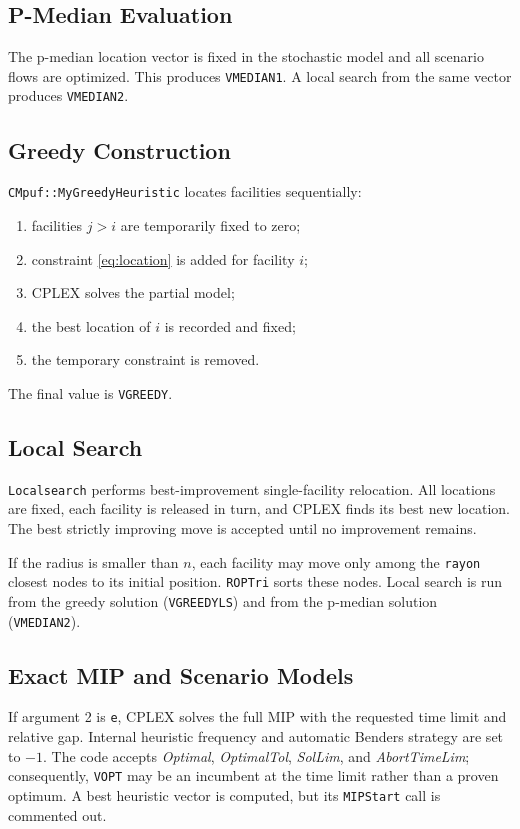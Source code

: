 \documentclass[11pt,a4paper]{article}
\newcommand{\code}[1]{\texttt{#1}}
\begin{document}
\subsection{P-Median Evaluation}

The p-median location vector is fixed in the stochastic model and all
scenario flows are optimized. This produces \code{VMEDIAN1}. A local search
from the same vector produces \code{VMEDIAN2}.

\subsection{Greedy Construction}

\code{CMpuf::MyGreedyHeuristic} locates facilities sequentially:
\begin{enumerate}
\item facilities $j>i$ are temporarily fixed to zero;
\item constraint \eqref{eq:location} is added for facility $i$;
\item CPLEX solves the partial model;
\item the best location of $i$ is recorded and fixed;
\item the temporary constraint is removed.
\end{enumerate}
The final value is \code{VGREEDY}.

\subsection{Local Search}

\code{Localsearch} performs best-improvement single-facility relocation. All
locations are fixed, each facility is released in turn, and CPLEX finds its
best new location. The best strictly improving move is accepted until no
improvement remains.

If the radius is smaller than $n$, each facility may move only among the
\code{rayon} closest nodes to its initial position. \code{ROPTri} sorts these
nodes. Local search is run from the greedy solution
(\code{VGREEDYLS}) and from the p-median solution (\code{VMEDIAN2}).

\subsection{Exact MIP and Scenario Models}

If argument 2 is \code{e}, CPLEX solves the full MIP with the requested time
limit and relative gap. Internal heuristic frequency and automatic Benders
strategy are set to $-1$. The code accepts \emph{Optimal},
\emph{OptimalTol}, \emph{SolLim}, and \emph{AbortTimeLim}; consequently,
\code{VOPT} may be an incumbent at the time limit rather than a proven
optimum. A best heuristic vector is computed, but its \code{MIPStart} call is
commented out.
\end{document}
